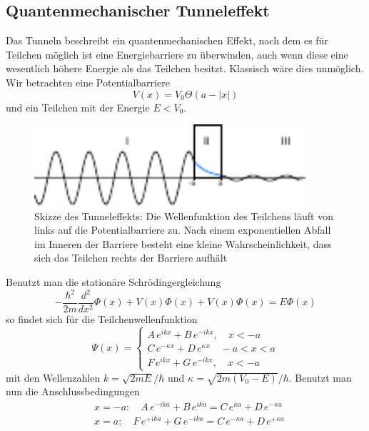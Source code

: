     \subsection{Quantenmechanischer Tunneleffekt}

Das Tunneln beschreibt ein quantenmechanischen Effekt, nach dem es für Teilchen
möglich ist eine Energiebarriere zu überwinden, auch wenn diese eine wesentlich
höhere Energie als das Teilchen besitzt. Klassisch wäre dies unmöglich.\\
Wir betrachten eine Potentialbarriere 
\[
    V(x) = V_0 \Theta ( a - |x| )    
\]
und ein Teilchen mit der Energie $E < V_0$.
\begin{figure}[h]
   \centering
   \includegraphics[width=0.9\textwidth]{Abb/tunnel.pdf}
   \caption{Skizze des Tunneleffekts: Die Wellenfunktion des Teilchens läuft von 
            links auf die Potentialbarriere zu. Nach einem exponentiellen Abfall
            im Inneren der Barriere besteht eine kleine Wahrscheinlichkeit, dass
            sich das Teilchen rechts der Barriere aufhält}
   \label{tunnel} 
\end{figure}
Benutzt man die stationäre Schrödingergleichung
\[
    - \frac{\hbar^2}{2m} \frac{d^2}{dx^2} \Phi(x) + V(x) \Phi(x) + V(x) \Phi(x)
    = E \Phi(x)    
\]
so findet sich für die Teilchenwellenfunktion
\[
    \Psi(x) = 
        \begin{cases}
            A \, e^{ikx} + B \, e^{-ikx}, \quad x<-a\\
            C \, e^{-\kappa x} + D \, e^{\kappa x} \quad -a < x < a\\
            F \, e^{ikx} + G \, e^{-ikx}, \quad x<-a
        \end{cases}
\]
mit den Wellenzahlen $k=\sqrt{2mE}/\hbar$ und $\kappa = \sqrt{2m(V_0-E)}/\hbar$.
Benutzt man nun die Anschlussbedingungen
\begin{align*}
    &x=-a: \quad A \, e^{-ika} + B \, e^{ika} = C \, e^{\kappa a} 
        + D \, e^{-\kappa a}\\
    &x=a: \quad F \, e^{+ika} + G \, e^{-ika} = C \, e^{-\kappa a} 
        + D \, e^{+\kappa a}
\end{align*}
